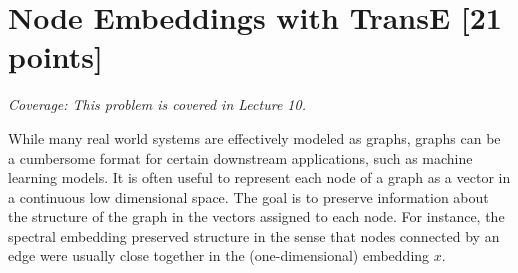 \section{Node Embeddings with TransE [21 points]}
\noindent\textit{Coverage: This problem is covered in Lecture 10.}

While many real world systems are effectively modeled as graphs, graphs can be a cumbersome format for certain downstream applications, such as machine learning models. It is often useful to represent each node of a graph as a vector in a continuous low dimensional space. The goal is to preserve information about the structure of the graph in the vectors assigned to each node. For instance, the spectral embedding preserved structure in the sense that nodes connected by an edge were usually close together in the (one-dimensional) embedding $x$.\\

